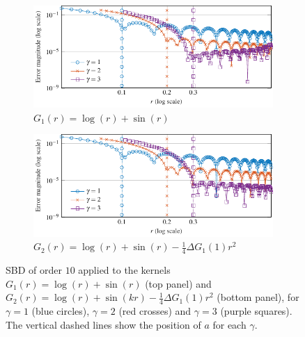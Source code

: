 \documentclass{article}
\begin{document}
\begin{figure}[ht]	
	\centering
	\setlength{\plotwidth}{\textwidth}
	\begin{subfigure}[b]{\plotwidth}
		\centering
		\includegraphics[scale = 1]{ArbitraryKernBadSit}
		\caption{$G_1(r) = \log(r) + \sin(r)$}
	\end{subfigure}
	\vspace{5.0pt}
	
	\begin{subfigure}[b]{\plotwidth}
		\centering
		\includegraphics[scale = 1]{ArbitraryKernGoodSit}
		\caption{$G_2(r) = \log(r) + \sin(r) - \frac{1}{4}\Delta G_1(1)r^2$}		
	\end{subfigure}
	\caption{SBD of order $10$ applied to the kernels $G_1(r) = \log(r) + \sin(r)$ (top panel) and $G_2(r) = \log(r) + \sin(kr) - \frac{1}{4}\Delta G_1(1)r^2$ (bottom panel), for $\gamma = 1$ (blue circles), $\gamma = 2$ (red crosses) and $\gamma = 3$ (purple squares). The vertical dashed lines show the position of $a$ for each $\gamma$.}
	\label{fig:badSit}
\end{figure}

			
\end{document}
